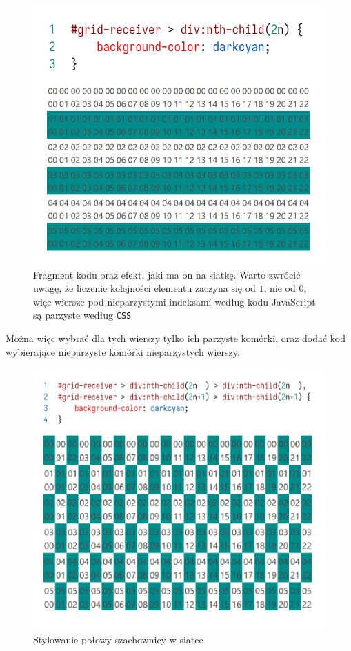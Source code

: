 \documentclass[licencjacka]{pracadypl}
\begin{document}
\begin{figure}[H]
  \centering
  \includegraphics[width=\linewidth/\real{2}]{images/codeui-row-coloring.png}
  \caption{Fragment kodu oraz efekt, jaki ma on na siatkę. Warto zwrócić uwagę, \linebreak że liczenie kolejności elementu zaczyna się od $1$, nie od $0$, więc wiersze pod nieparzystymi indeksami według kodu JavaScript są parzyste według \texttt{CSS}}
  \label{fig:codeui-row-coloring}
\end{figure}

Można więc wybrać dla tych wierszy tylko ich parzyste komórki, oraz dodać kod wybierające nieparzyste komórki nieparzystych wierszy.

\begin{figure}[H]
  \centering
  \includegraphics[width=\linewidth/\real{2}]{images/codeui-checkerboard-half-coloring.png}
  \caption{Stylowanie połowy szachownicy w siatce}
  \label{fig:codeui-checkerboard-half-coloring}
\end{figure}
\end{document}
